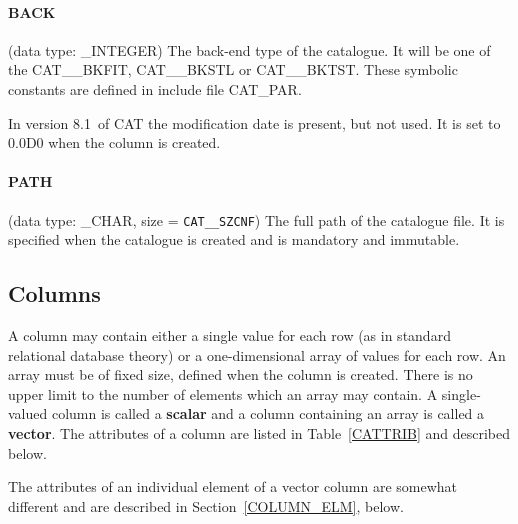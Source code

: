 \documentclass[11pt,twoside]{starlink}
\providecommand{\CATversion}{8.1~}
\begin{document}
\paragraph{BACK}
(data type: \_INTEGER)
The back-end type of the catalogue. It will be one of the CAT\_\_BKFIT,
CAT\_\_BKSTL or CAT\_\_BKTST. These symbolic constants are defined in
include file CAT\_PAR.

In version \CATversion of CAT the modification date is present, but
not used. It is set to 0.0D0 when the column is created.

\paragraph{PATH}
(data type: \_CHAR, size = \texttt{CAT\_\_SZCNF}) The full path of the
catalogue file. It is specified when the catalogue is created and is
mandatory and immutable.

\subsection{\label{COLS}Columns}

A column may contain either a single value for each row (as in
standard relational database theory) or a one-dimensional array of
values for each row. An array must be of fixed size, defined when the
column is created. There is no upper limit to the number of elements
which an array may contain. A single-valued column is called a \textbf{scalar} and a column containing an array is called  a \textbf{vector}.
The attributes of a column are listed in Table~\ref{CATTRIB} and
described below.

The attributes of an individual element of a vector column are somewhat
different and are described in Section~\ref{COLUMN_ELM}, below.
\end{document}
